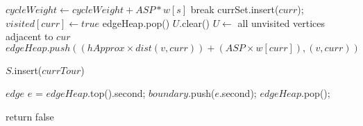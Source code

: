 \begin{algorithm}
\begin{algorithmic}

			$cycleWeight \gets cycleWeight + ASP*w[s]$
		\EndFor
			\State break 
		\EndIf
		\State currSet.insert($curr$);
		\State $visited[curr] \gets true$ 
		\State edgeHeap.pop() 
		\State $U$.clear() 
		\State $U  \gets$ all unvisited vertices adjacent to $cur$ 
			\State $edgeHeap.push((hApprox \times dist(v,curr)) + (ASP\times w[curr]) , (v,curr))$ 
		\EndFor
	\EndWhile
	
	\State $S$.insert($currTour$) 

		\State $edge$ $e$ = $edgeHeap$.top().second;
		\State $boundary$.push($e$.second);
		\State $edgeHeap$.pop();
	\EndWhile
	
		\State return false 
	\EndIf

\EndWhile
\EndFunction

\EndFunction

\end{algorithmic}
\end{algorithm}

\pagebreak

%
